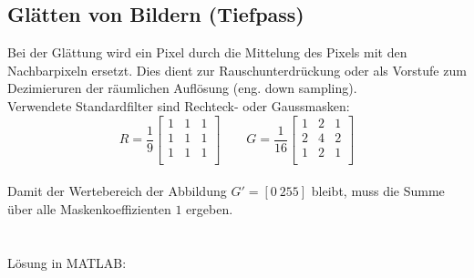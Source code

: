 \subsection{Glätten von Bildern (Tiefpass)}
Bei der Glättung wird ein Pixel durch die Mittelung des Pixels mit den Nachbarpixeln ersetzt.
Dies dient zur Rauschunterdrückung oder als Vorstufe zum Dezimieruren der räumlichen Auflösung (eng. down sampling).\\
Verwendete Standardfilter sind Rechteck- oder Gaussmasken:
\[
	R=\frac{1}{9} \left[\begin{matrix}
					1 & 1 & 1\\
					1 & 1 & 1\\
					1 & 1 & 1\\	\end{matrix}\right] \qquad
	G=\frac{1}{16} \left[\begin{matrix}
					1 & 2 & 1\\
					2 & 4 & 2\\
					1 & 2 & 1\\	\end{matrix}\right]
\]
~\\
Damit der Wertebereich der Abbildung $G' =[0\ 255]$ bleibt, muss die Summe über alle Maskenkoeffizienten $1$ ergeben.\\
\\\\
Lösung in MATLAB:
\lstset{language=Matlab}

~\\


